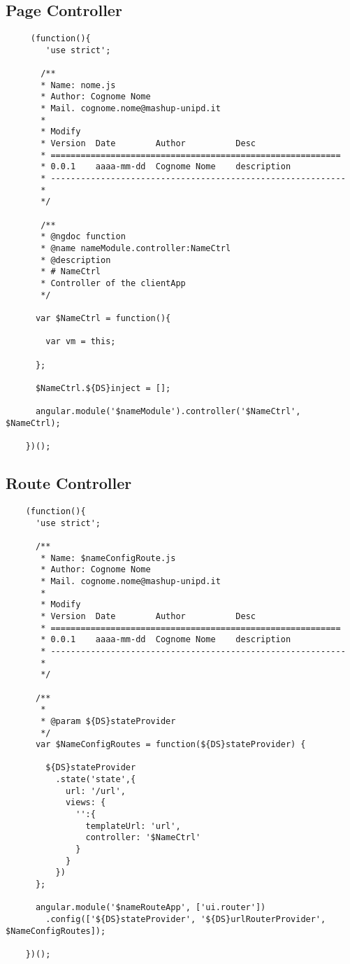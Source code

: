	\subsection{Page Controller} %
	\label{sub:page_controller}
	\begin{verbatim}
	 (function(){
	    'use strict';

	   /**
	   * Name: nome.js
	   * Author: Cognome Nome
	   * Mail. cognome.nome@mashup-unipd.it
	   *
	   * Modify
	   * Version  Date        Author          Desc
	   * ==========================================================
	   * 0.0.1    aaaa-mm-dd  Cognome Nome    description
	   * -----------------------------------------------------------
	   *
	   */

	   /**
	   * @ngdoc function
	   * @name nameModule.controller:NameCtrl
	   * @description
	   * # NameCtrl
	   * Controller of the clientApp
	   */

	  var $NameCtrl = function(){

	    var vm = this;

	  };

	  $NameCtrl.${DS}inject = [];

	  angular.module('$nameModule').controller('$NameCtrl', $NameCtrl);

	})();
	\end{verbatim}

	\subsection{Route Controller} %
	\label{sub:route_controller}
	\begin{verbatim}
	(function(){
	  'use strict';

	  /**
	   * Name: $nameConfigRoute.js
	   * Author: Cognome Nome
	   * Mail. cognome.nome@mashup-unipd.it
	   *
	   * Modify
	   * Version  Date        Author          Desc
	   * ==========================================================
	   * 0.0.1    aaaa-mm-dd  Cognome Nome    description
	   * -----------------------------------------------------------
	   *
	   */

	  /**
	   *
	   * @param ${DS}stateProvider
	   */
	  var $NameConfigRoutes = function(${DS}stateProvider) {

	    ${DS}stateProvider
	      .state('state',{
	        url: '/url',
	        views: {
	          '':{
	            templateUrl: 'url',
	            controller: '$NameCtrl'
	          }
	        }
	      })
	  };

	  angular.module('$nameRouteApp', ['ui.router'])
	    .config(['${DS}stateProvider', '${DS}urlRouterProvider', $NameConfigRoutes]);

	})();
	\end{verbatim}

